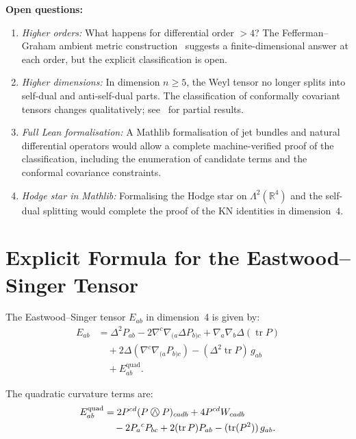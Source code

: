 \documentclass[11pt,a4paper]{article}
\newcommand{\owedge}{\mathbin{%
  \text{%
    \ooalign{%
      \hfil$\wedge$\hfil\cr
      \hfil\raisebox{0.05em}{$\bigcirc$}\hfil\cr
    }%
  }%
}}
\begin{document}
\medskip\noindent
\textbf{Open questions:}
\begin{enumerate}
  \item \emph{Higher orders:} What happens for differential order $> 4$?
    The Fefferman--Graham ambient metric construction~\cite{fefferman-graham2012}
    suggests a finite-dimensional answer at each order, but the
    explicit classification is open.
  \item \emph{Higher dimensions:} In dimension $n \ge 5$, the Weyl tensor
    no longer splits into self-dual and anti-self-dual parts. The
    classification of conformally covariant tensors changes qualitatively;
    see~\cite{gover-hirachi2004} for partial results.
  \item \emph{Full Lean formalisation:} A Mathlib formalisation
    of jet bundles and natural differential operators would allow
    a complete machine-verified proof of the classification, including
    the enumeration of candidate terms and the conformal covariance
    constraints.
  \item \emph{Hodge star in Mathlib:} Formalising the Hodge star
    on $\Lambda^2(\mathbb{R}^4)$ and the self-dual splitting would
    complete the proof of the KN identities in dimension~$4$.
\end{enumerate}

\appendix

\section{Explicit Formula for the Eastwood--Singer Tensor}
\label{app:es}

The Eastwood--Singer tensor $E_{ab}$ in dimension~4 is given by:
\begin{align}
E_{ab} &= \Delta^2 P_{ab}
  - 2\nabla^c\nabla_{(a}\Delta P_{b)c}
  + \nabla_a\nabla_b\Delta(\operatorname{tr} P) \label{eq:es_linear}\\
  &\quad + 2\Delta(\nabla^c\nabla_{(a}P_{b)c})
  - (\Delta^2\operatorname{tr} P)\,g_{ab} \nonumber \\
  &\quad + E_{ab}^{\text{quad}}. \nonumber
\end{align}

The quadratic curvature terms are:
\begin{align}
E_{ab}^{\text{quad}} &=
  2P^{cd}(P \owedge P)_{cadb}
  + 4P^{cd}W_{cadb} \label{eq:es_quad}\\
  &\quad - 2P_a{}^c P_{bc} + 2(\operatorname{tr} P) P_{ab}
  - (\operatorname{tr}(P^2))\,g_{ab}. \nonumber
\end{align}
\end{document}
